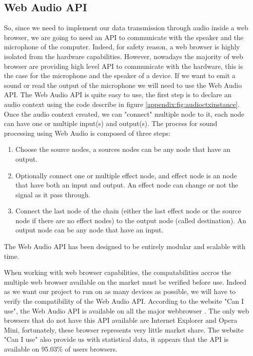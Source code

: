 \documentclass[twocolumn,14pt]{extarticle}
\begin{document}
\subsection{Web Audio API}
So, since we need to implement our data transmission through audio inside a web browser, we are going to need an API to communicate with the speaker and the microphone of the computer. Indeed, for safety reason, a web browser is highly isolated from the hardware capabilities. However, nowadays the majority of web browser are providing high level API to communicate with the hardware, this is the case for the microphone and the speaker of a device. If we want to emit a sound or read the output of the microphone we will need to use the Web Audio API. The Web Audio API is quite easy to use, the first step is to declare an audio context using the code describe in figure \ref{appendix:fig:audioctxinstance}. Once the audio context created, we can "connect" multiple node to it, each node can have one or multiple input(s) and output(s). The process for sound processing using Web Audio is composed of three steps:
\begin{enumerate}
\item Choose the source nodes, a sources nodes can be any node that have an output.
\item Optionally connect one or multiple effect node, and effect node is an node that have both an input and output. An effect node can change or not the signal as it pass through.
\item Connect the last node of the chain (either the last effect node or the source node if there are no effect nodes) to the output node (called destination). An output node can be any node that have an input.
\end{enumerate}
The Web Audio API has been designed to be entirely modular and scalable with time.

When working with web browser capabilities, the compatabilities accros the multiple web browser available on the market must be verified before use. Indeed as we want our project to run on as many devices as possible, we will have to verify the compatibility of the Web Audio API. According to the website "Can I use", the Web Audio API is available on all the major webbrowser \cite{can_i_use}. The only web browsers that do not have this API available are Internet Explorer and Opera Mini, fortunately, these browser represents very little market share. The website "Can I use" also provide us with statistical data, it appears that the API is available on 95.03\% of users browsers.
\end{document}
